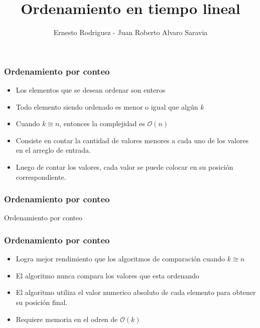 \documentclass{beamer}
\title[Tiempo Lineal]{Ordenamiento en tiempo lineal}
\author{Ernesto Rodriguez - Juan Roberto Alvaro Saravia}
\institute{
    Universidad Francisco Marroquin \\
    \medskip \textit{ernestorodriguez@ufm.edu - juanalvarado@ufm.edu}
}
\date[\today]{}
\begin{document}
\begin{frame}
\titlepage
\end{frame}

\begin{frame}
\frametitle{Ordenamiento por conteo}
\begin{itemize}
    \item{Los elementos que se desean ordenar son enteros}
    \item{Todo elemento siendo ordenado es menor o igual que alg\'un $k$}
    \item{Cuando $k\cong n$, entonces la complejidad es $\mathcal{O}(n)$}
    \item{Consiste en contar la cantidad de valores menores a cada uno
    de los valores en el arreglo de entrada.}
    \item{Luego de contar los valores, cada valor se puede colocar
    en su posici\'on correspondiente.}
\end{itemize}
\end{frame}

\begin{frame}
    \frametitle{Ordenamiento por conteo}
    \begin{algorithm}[H]
        \caption{Ordenamiento por conteo}
        \begin{algorithmic}[1]
        \EndFor
        \EndFor
        \EndFor
        \EndFor
        \EndProcedure
        \end{algorithmic}
    \end{algorithm}
\end{frame}

\begin{frame}
    \frametitle{Ordenamiento por conteo}
    \begin{itemize}
        \item{Logra mejor rendimiento que los algoritmos de comparaci\'on
        cuando $k\cong n$}
        \item{El algoritmo nunca compara los valores que esta ordenando}
        \item{El algoritmo utiliza el valor numerico absoluto de cada
        elemento para obtener su posici\'on final.}
        \item{Requiere memoria en el odren de $\mathcal{O}(k)$}
    \end{itemize}
\end{frame}
\end{document}
